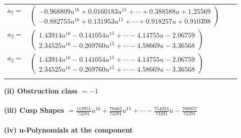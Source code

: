 \documentclass[1p]{elsarticle_modified}
\theoremstyle{definition}
\begin{document}
\begin{tabular}{m{7pt} m{180pt} m{7pt} m{180pt} }
\flushright $a_{7}=$&$\begin{pmatrix}-0.968809 u^{16}+0.0160183 u^{15}+\cdots+0.388588 u+1.25569\\-0.882755 u^{16}+0.131953 u^{15}+\cdots+0.918257 u+0.910398\end{pmatrix}$ \\
\flushright $a_{2}=$&$\begin{pmatrix}1.43914 u^{16}-0.141054 u^{15}+\cdots-4.14755 u-2.06759\\2.34525 u^{16}-0.269760 u^{15}+\cdots-4.58669 u-3.36568\end{pmatrix}$\\ \flushright $a_{2}=$&$\begin{pmatrix}1.43914 u^{16}-0.141054 u^{15}+\cdots-4.14755 u-2.06759\\2.34525 u^{16}-0.269760 u^{15}+\cdots-4.58669 u-3.36568\end{pmatrix}$\\&\end{tabular}
\flushleft \textbf{(ii) Obstruction class $= -1$}\\~\\
\flushleft \textbf{(iii) Cusp Shapes $= \frac{112951}{73291} u^{16}+\frac{78462}{73291} u^{15}+\cdots-\frac{754923}{73291} u-\frac{768857}{73291}$}\\~\\
\newpage\renewcommand{\arraystretch}{1}
\flushleft \textbf{(iv) u-Polynomials at the component}\newline \\
\end{document}
